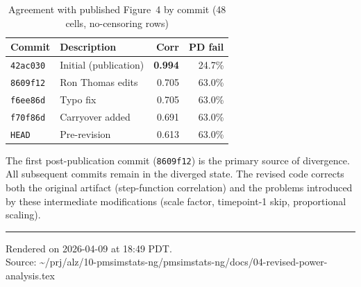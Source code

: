 \documentclass[11pt]{article}
\begin{document}
\begin{table}[h]
\centering
\caption{Agreement with published Figure~4 by commit
  (48 cells, no-censoring rows)}
\begin{tabular}{llrr}
\toprule
Commit & Description & Corr & PD fail \\
\midrule
\texttt{42ac030} & Initial (publication) &
  \textbf{0.994} & 24.7\% \\
\texttt{8609f12} & Ron Thomas edits &
  0.705 & 63.0\% \\
\texttt{f6ee86d} & Typo fix &
  0.705 & 63.0\% \\
\texttt{f70f86d} & Carryover added &
  0.691 & 63.0\% \\
\texttt{HEAD} & Pre-revision &
  0.613 & 63.0\% \\
\bottomrule
\end{tabular}
\end{table}

The first post-publication commit (\texttt{8609f12}) is the
primary source of divergence. All subsequent commits remain
in the diverged state. The revised code corrects both the
original artifact (step-function correlation) and the
problems introduced by these intermediate modifications
(scale factor, timepoint-1 skip, proportional scaling).

\vfill
\noindent\rule{\textwidth}{0.4pt}
{\footnotesize
Rendered on 2026-04-09 at 18:49 PDT.\\
Source: \textasciitilde/prj/alz/10-pmsimstats-ng/pmsimstats-ng/docs/04-revised-power-analysis.tex}
\end{document}
